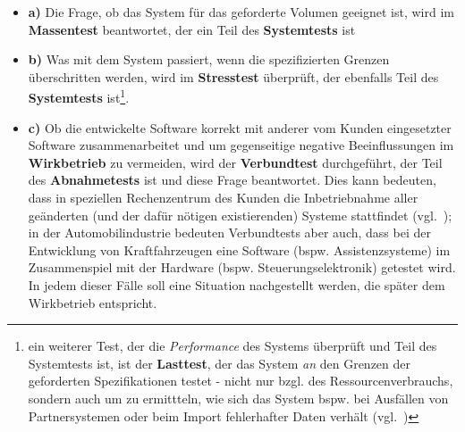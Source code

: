 


\begin{itemize}
    \item \textbf{a)} Die Frage, ob das System für das geforderte Volumen geeignet ist, wird im \textbf{Massentest} beantwortet, der ein Teil des \textbf{Systemtests} ist
    \item \textbf{b)} Was mit dem System passiert, wenn die spezifizierten Grenzen überschritten werden, wird im \textbf{Stresstest} überprüft, der ebenfalls Teil des \textbf{Systemtests} ist\footnote{
    ein weiterer Test, der die \textit{Performance} des Systems überprüft und Teil des Systemtests ist, ist der \textbf{Lasttest}, der das System \textit{an} den Grenzen der geforderten Spezifikationen testet - nicht nur bzgl. des Ressourcenverbrauchs, sondern auch um zu ermittteln, wie sich das System bspw. bei Ausfällen von Partnersystemen oder beim Import fehlerhafter Daten verhält (vgl.~\cite[63]{Wed09c})
    }.
    \item \textbf{c)} Ob die entwickelte Software korrekt mit anderer vom Kunden eingesetzter Software zusammenarbeitet und um gegenseitige negative Beeinflussungen im \textbf{Wirkbetrieb} zu vermeiden, wird der \textbf{Verbundtest} durchgeführt, der Teil des \textbf{Abnahmetests} ist und diese Frage beantwortet.
    Dies kann bedeuten, dass in speziellen Rechenzentrum des Kunden die Inbetriebnahme aller geänderten (und der dafür nötigen existierenden) Systeme stattfindet (vgl.~\cite[65]{Wed09c}); in der Automobilindustrie bedeuten Verbundtests aber auch, dass bei der Entwicklung von Kraftfahrzeugen eine Software (bspw. Assistenzsysteme) im Zusammenspiel mit der Hardware (bspw. Steuerungselektronik) getestet wird.
    In jedem dieser Fälle  soll eine Situation nachgestellt werden, die später dem Wirkbetrieb entspricht.
\end{itemize}